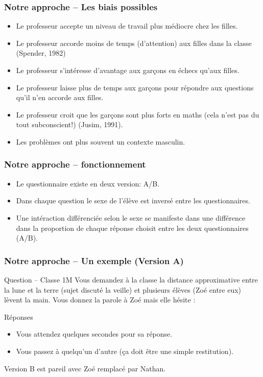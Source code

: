 \documentclass{beamer}
\begin{document}
\begin{frame}
\frametitle{Notre approche -- Les biais possibles}
\begin{itemize}
\item Le professeur accepte un niveau de travail plus médiocre chez les filles.
\item Le professeur accorde moins de temps (d’attention) aux filles dans
  la classe (Spender, 1982)
\item Le professeur s’intéresse d'avantage aux garçons en échecs qu’aux filles.
\item Le professeur laisse plus de temps aux garçons pour répondre aux
  questions qu’il n’en accorde aux filles.
\item Le professeur croit que les garçons sont plus forts en maths
  (cela n’est pas du tout subconscient!) (Jusim, 1991).
\item Les problèmes ont plus souvent un contexte masculin.
\end{itemize}
\end{frame}

\begin{frame}
\frametitle{Notre approche -- fonctionnement}
\begin{itemize}
\item Le questionnaire existe en deux version: A/B.
\item Dans chaque question le sexe de l'élève est inversé entre
  les questionnaires.
\item Une intéraction différenciée selon le sexe se manifeste dans une différence
dans la proportion de chaque réponse choisit entre les deux questionnaires (A/B). 
  
\end{itemize}
\end{frame}


\begin{frame}
\frametitle{Notre approche -- Un exemple (Version A)}
\begin{block}{Question – Classe 1M}
  Vous demandez à la classe la distance approximative entre la lune et la terre
  (sujet discuté la veille) et plusieurs élèves (Zoé entre eux) lèvent la main.
  Vous donnez la parole à Zoé mais elle hésite :
\end{block}

\begin{block}{Réponses}
\begin{itemize}
\item Vous attendez quelques secondes pour sa réponse.
\item Vous passez à quelqu’un d’autre (ça doit être une simple restitution).
\end{itemize}
\end{block}

Version B est pareil avec Zoé remplacé par Nathan.
\end{frame}
\end{document}
